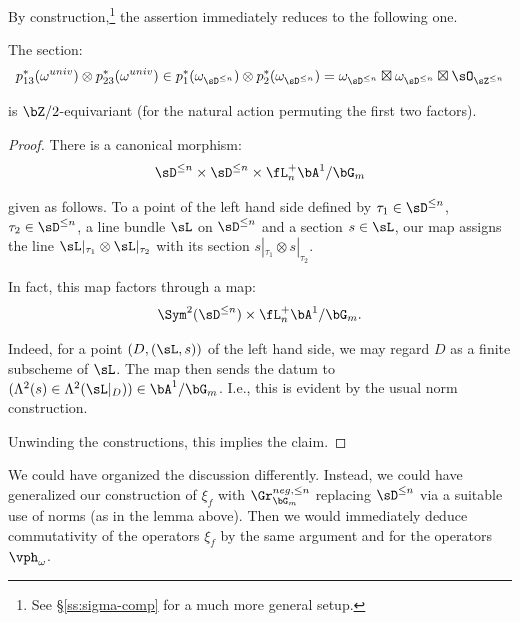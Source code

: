 By construction,\footnote{See \S \ref{ss:sigma-comp} for a much more general
setup.}
the assertion immediately reduces to the following one.

\begin{lem}
\notready

The section:
%
\[
p_{13}^*(\omega^{univ}) \otimes p_{23}^*(\omega^{univ}) \in
p_1^*(\omega_{\sD^{\leq n}}) \otimes p_2^*(\omega_{\sD^{\leq n}}) =
\omega_{\sD^{\leq n}} \boxtimes \omega_{\sD^{\leq n}}
\boxtimes \sO_{\sZ^{\leq n}}
\]

 is $\bZ/2$-equivariant (for the natural action
permuting the first two factors).

\end{lem}

\begin{proof}

There is a canonical morphism:
%
\[
\sD^{\leq n} \times \sD^{\leq n} \times \fL_n^+ \bA^1/\bG_m
\]

 given as follows. To a point of the left hand side
defined by
$\tau_1 \in \sD^{\leq n}$, $\tau_2 \in \sD^{\leq n}$,
a line bundle $\sL$ on $\sD^{\leq n}$ and a section
$s \in \sL$, our map assigns the line
$\sL|_{\tau_1} \otimes \sL|_{\tau_2}$ with
its section $s|_{\tau_1}\otimes s|_{\tau_2}$.

In fact, this map factors through a map:
%
\[
\Sym^2(\sD^{\leq n}) \times \fL_n^+ \bA^1/\bG_m.
\]

 Indeed, for a point $(D,(\sL,s))$ of the left hand
side, we may regard $D$ as a finite subscheme of $\sL$.
The map then sends the datum to
$(\Lambda^2(s) \in \Lambda^2(\sL|_D)) \in \bA^1/\bG_m$.
I.e., this is evident by the usual norm construction.

Unwinding the constructions, this implies the claim.

\end{proof}

\begin{rem}
\notready

We could have organized the discussion differently.
Instead, we could have generalized our
construction of $\xi_f$ with $\Gr_{\bG_m}^{neg,\leq n}$ replacing
$\sD^{\leq n}$ via a suitable use of norms (as in the lemma
above). Then we would immediately deduce commutativity of the
operators $\xi_f$ by the same argument and for the operators
$\vph_{\omega}$.

\end{rem}


